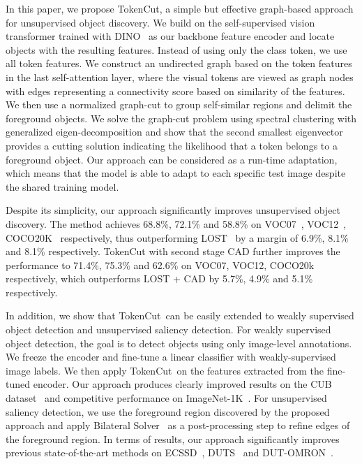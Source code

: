 \documentclass[twocolumn]{article}
\newcommand{\name} {TokenCut}
\begin{document}
In this paper, we propose \name, a simple but effective graph-based approach for unsupervised object discovery. We build on the self-supervised vision transformer trained with DINO~\cite{caron2021emerging} as our backbone feature encoder and locate objects with the resulting features. Instead of using only the class token, we use all token features. We construct an undirected graph based on the token features in the last self-attention layer, where the visual tokens are viewed as graph nodes with edges representing a connectivity score based on  similarity of the features. We then use a normalized graph-cut to
group self-similar regions and delimit the foreground objects. We solve the graph-cut problem using spectral clustering with generalized eigen-decomposition and show that the second smallest eigenvector provides a cutting solution indicating the likelihood that a token belongs to a foreground object. Our approach can be considered as a run-time adaptation, which means that the model is able to adapt to each specific test image despite the shared training model.

Despite its simplicity, our approach significantly improves unsupervised object discovery. 
The method achieves 68.8\%, 72.1\% and 58.8\% on VOC07~\cite{pascal-voc-2007}, VOC12~\cite{pascal-voc-2012}, COCO20K~\cite{lin2014microsoft} respectively, thus outperforming LOST~\cite{simeoni2021localizing} by a margin of 6.9\%, 8.1\% and 8.1\% respectively.  TokenCut with second stage CAD further improves the performance to 71.4\%, 75.3\% and 62.6\% on VOC07, VOC12, COCO20k respectively, which outperforms LOST + CAD by 5.7\%, 4.9\% and 5.1\% respectively.

In addition, we show that \name~can be easily extended to weakly supervised object detection and unsupervised saliency detection. 
For weakly supervised object detection, the goal is to detect objects using only image-level annotations. 
We freeze the encoder and fine-tune a linear classifier with weakly-supervised image labels. 
We then  apply  \name~on the features extracted from the fine-tuned encoder. Our approach produces clearly improved results on the CUB dataset~\cite{WahCUB_200_2011} and competitive performance on ImageNet-1K~\cite{deng2009imagenet}. For unsupervised saliency detection, we use the foreground region discovered by the proposed approach and apply Bilateral Solver~\cite{barron2016fast} as a post-processing step to refine edges of the foreground region. In terms of results, our approach significantly improves previous state-of-the-art methods on ECSSD~\cite{shi2015hierarchical}, DUTS~\cite{wang2017learning} and DUT-OMRON~\cite{yang2013saliency}. 
\end{document}
